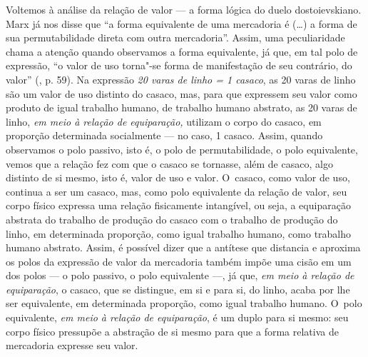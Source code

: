 Voltemos à análise da relação de valor --- a forma lógica do duelo
dostoievskiano. Marx já nos disse que ``a forma equivalente de uma
mercadoria é (\ldots) a forma de sua permutabilidade direta com outra
mercadoria''. Assim, uma peculiaridade chama a atenção quando observamos
a forma equivalente, já que, em tal polo de expressão, ``o valor de uso
torna"-se forma de manifestação de seu contrário, do valor'' (, p.
59). Na expressão \emph{20 varas de linho = 1 casaco}, as 20 varas de
linho são um valor de uso distinto do casaco, mas, para que expressem
seu valor como produto de igual trabalho humano, de trabalho humano
abstrato, as 20 varas de linho, \emph{em meio à relação de equiparação,}
utilizam o corpo do casaco, em proporção determinada socialmente --- no
caso, 1 casaco. Assim, quando observamos o polo passivo, isto é, o polo
de permutabilidade, o polo equivalente, vemos que a relação fez com que
o casaco se tornasse, além de casaco, algo distinto de si mesmo, isto é,
valor de uso e valor. O~casaco, como valor de uso, continua a ser um
casaco, mas, como polo equivalente da relação de valor, seu corpo físico
expressa uma relação fisicamente intangível, ou seja, a equiparação
abstrata do trabalho de produção do casaco com o trabalho de produção do
linho, em determinada proporção, como igual trabalho humano, como
trabalho humano abstrato. Assim, é possível dizer que a antítese que
distancia e aproxima os polos da expressão de valor da mercadoria também
impõe uma cisão em um dos polos --- o polo passivo, o polo equivalente
---, já que, \emph{em meio à relação de equiparação}, o casaco, que se
distingue, em si e para si, do linho, acaba por lhe ser equivalente, em
determinada proporção, como igual trabalho humano. O~polo equivalente,
\emph{em meio à relação de equiparação}, é um duplo para si mesmo: seu
corpo físico pressupõe a abstração de si mesmo para que a forma relativa
de mercadoria expresse seu valor.

